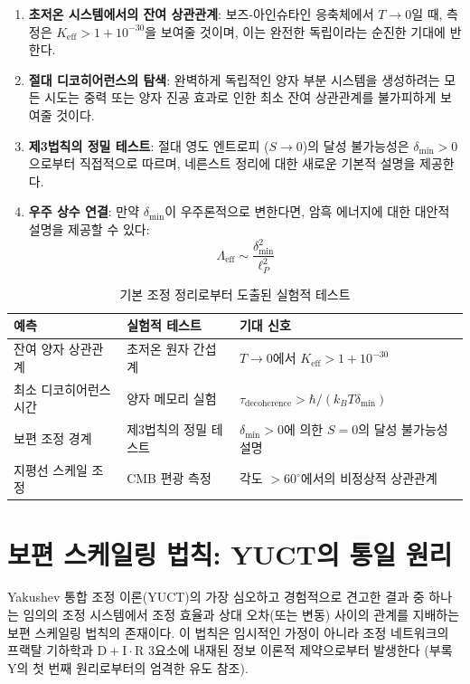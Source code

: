 \documentclass[11pt,a4paper]{article}
\begin{document}
\begin{enumerate}
	\item \textbf{초저온 시스템에서의 잔여 상관관계}: 보즈-아인슈타인 응축체에서 $T \to 0$일 때, 측정은 $K_{\mathrm{eff}} > 1 + 10^{-30}$을 보여줄 것이며, 이는 완전한 독립이라는 순진한 기대에 반한다.
	\item \textbf{절대 디코히어런스의 탐색}: 완벽하게 독립적인 양자 부분 시스템을 생성하려는 모든 시도는 중력 또는 양자 진공 효과로 인한 최소 잔여 상관관계를 불가피하게 보여줄 것이다.
	\item \textbf{제3법칙의 정밀 테스트}: 절대 영도 엔트로피 ($S \to 0$)의 달성 불가능성은 $\delta_{\min} > 0$으로부터 직접적으로 따르며, 네른스트 정리에 대한 새로운 기본적 설명을 제공한다.
	\item \textbf{우주 상수 연결}: 만약 $\delta_{\min}$이 우주론적으로 변한다면, 암흑 에너지에 대한 대안적 설명을 제공할 수 있다:
	\begin{equation}
		\Lambda_{\mathrm{eff}} \sim \frac{\delta_{\min}^2}{\ell_P^2}
	\end{equation}
\end{enumerate}

\begin{table}[htbp]
	\centering
	\small
	\begin{tabular}{p{}p{}p{}}
		\toprule
		\textbf{예측} & \textbf{실험적 테스트} & \textbf{기대 신호} \\
		\midrule
		잔여 양자 상관관계 & 초저온 원자 간섭계 & $T \to 0$에서 $K_{\mathrm{eff}} > 1 + 10^{-30}$ \\
		최소 디코히어런스 시간 & 양자 메모리 실험 & $\tau_{\text{decoherence}} > \hbar/(k_B T \delta_{\min})$ \\
		보편 조정 경계 & 제3법칙의 정밀 테스트 & $\delta_{\min}>0$에 의한 $S=0$의 달성 불가능성 설명 \\
		지평선 스케일 조정 & CMB 편광 측정 & 각도 $>60^\circ$에서의 비정상적 상관관계 \\
		\bottomrule
	\end{tabular}
	\caption{기본 조정 정리로부터 도출된 실험적 테스트}
	\label{tab:theorem-predictions}
\end{table}

\section{보편 스케일링 법칙: YUCT의 통일 원리}
\label{sec:universal_scaling}

Yakushev 통합 조정 이론(YUCT)의 가장 심오하고 경험적으로 견고한 결과 중 하나는 임의의 조정 시스템에서 조정 효율과 상대 오차(또는 변동) 사이의 관계를 지배하는 보편 스케일링 법칙의 존재이다. 이 법칙은 임시적인 가정이 아니라 조정 네트워크의 프랙탈 기하학과 $\mathrm{D} + \mathrm{I}\cdot \mathrm{R}$ 3요소에 내재된 정보 이론적 제약으로부터 발생한다 (부록 Y의 첫 번째 원리로부터의 엄격한 유도 참조).
\end{document}
